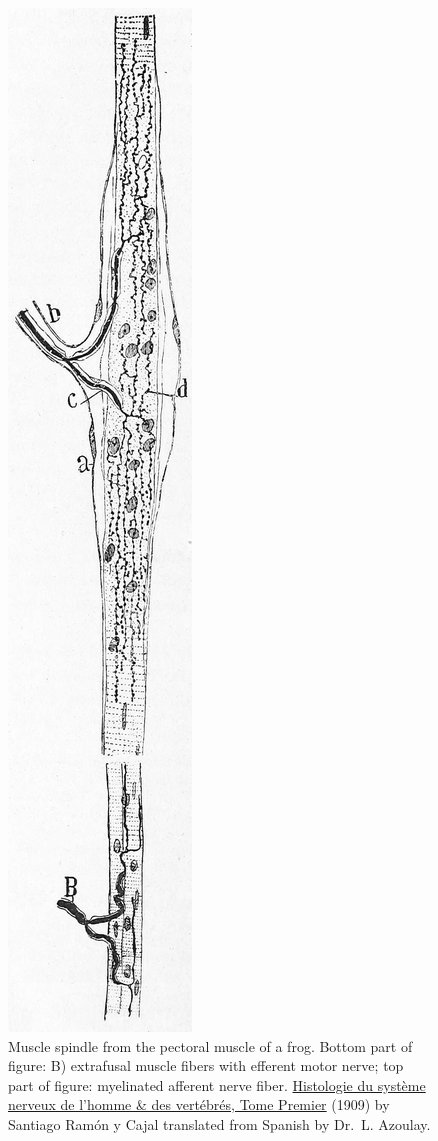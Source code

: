 \begin{figure}

{\centering \includegraphics[width=0.7\linewidth]{./figures/somatosensory/CajalMuscleSpindle} 

}

\caption{Muscle spindle from the pectoral muscle of a frog. Bottom part of figure: B) extrafusal muscle fibers with efferent motor nerve; top part of figure: myelinated afferent nerve fiber. \href{https://wellcomelibrary.org/item/b2129592x\#?c=0\&m=0\&s=0\&cv=14\&z=0\%2C-3.48\%2C1\%2C8.6591}{Histologie du système nerveux de l'homme \& des vertébrés, Tome Premier} (1909) by Santiago Ramón y Cajal translated from Spanish by Dr.~L. Azoulay.}\label{fig:musclespindle}
\end{figure}

